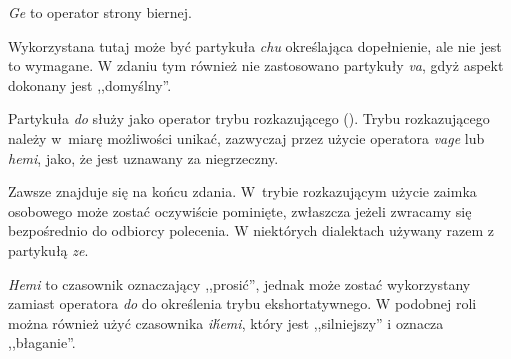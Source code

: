 \begin{spacing}{1.1}



\skipline

\emph{Ge} to operator strony biernej.


Wykorzystana tutaj może być partykuła \emph{chu} określająca dopełnienie, ale
nie jest to wymagane. W zdaniu tym również nie zastosowano partykuły \emph{va},
gdyż aspekt dokonany jest ,,domyślny''.

Partykuła \emph{do} służy jako operator trybu rozkazującego (\Imp{}). Trybu
rozkazującego należy w~miarę możliwości unikać, zazwyczaj przez użycie operatora
\emph{vage} lub \emph{hemi}, jako, że jest uznawany za niegrzeczny.

Zawsze znajduje się na końcu zdania. W~trybie rozkazującym użycie zaimka
osobowego może zostać oczywiście pominięte, zwłaszcza jeżeli zwracamy się
bezpośrednio do odbiorcy polecenia. W niektórych dialektach używany razem z
partykułą \emph{ze}.



\emph{Hemi} to czasownik oznaczający ,,prosić'', jednak może zostać wykorzystany
zamiast operatora \emph{do} do określenia trybu ekshortatywnego. W podobnej roli
można również użyć czasownika \emph{ih́emi}, który jest ,,silniejszy'' i oznacza
,,błaganie''.


\end{spacing}

